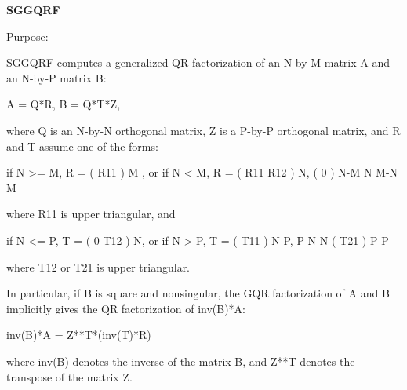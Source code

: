 {\bfseries S\+G\+G\+Q\+R\+F} 

 \begin{DoxyParagraph}{Purpose\+: }
\begin{DoxyVerb} SGGQRF computes a generalized QR factorization of an N-by-M matrix A
 and an N-by-P matrix B:

             A = Q*R,        B = Q*T*Z,

 where Q is an N-by-N orthogonal matrix, Z is a P-by-P orthogonal
 matrix, and R and T assume one of the forms:

 if N >= M,  R = ( R11 ) M  ,   or if N < M,  R = ( R11  R12 ) N,
                 (  0  ) N-M                         N   M-N
                    M

 where R11 is upper triangular, and

 if N <= P,  T = ( 0  T12 ) N,   or if N > P,  T = ( T11 ) N-P,
                  P-N  N                           ( T21 ) P
                                                      P

 where T12 or T21 is upper triangular.

 In particular, if B is square and nonsingular, the GQR factorization
 of A and B implicitly gives the QR factorization of inv(B)*A:

              inv(B)*A = Z**T*(inv(T)*R)

 where inv(B) denotes the inverse of the matrix B, and Z**T denotes the
 transpose of the matrix Z.\end{DoxyVerb}
 
\end{DoxyParagraph}

